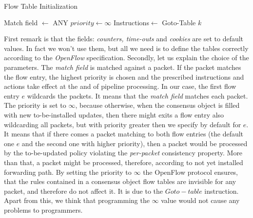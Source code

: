 \documentclass{article}
\theoremstyle{remark}
\begin{document}
\begin{algorithm}
  \caption{Flow Table Initialization}\label{FTInit}
  \begin{algorithmic}[1]
        \State Match field $\gets$ ANY
        \State $priority\gets\infty$
        \State Instructions$\gets$ Goto-Table $k$
      \EndFor
  \end{algorithmic}
\end{algorithm}
First remark is that the fields: \emph{counters, time-outs} and \emph{cookies} are set to default values. In fact we won't use them, but all we need is to define the tables correctly according to the \emph{OpenFlow} specification. Secondly, let us explain the choice of the parameters. The \emph{match field} is matched against a packet. If the packet matches the flow entry, the highest priority is chosen and the prescribed instructions and actions take effect at the and of pipeline processing. In our case, the first flow entry $e$ wildcards the packets. It means that the \emph{match field} matches each packet. The priority is set to $\infty$, because otherwise, when the consensus object is filled with new to-be-installed updates, then there might exits a flow entry also wildcarding all packets, but with priority greater then we specify by default for $e$. It means that if there comes a packet matching to both flow entries (the default one $e$ and the second one with higher priority), then a packet would be processed by the to-be-updated policy violating the \emph{per-packet} consistency property. More than that, a packet might be processed, therefore, according to not yet installed forwarding path.
By setting the priority to $\infty$ the OpenFlow protocol ensures, that the rules contained in a consensus object flow tables are invisible for any packet, and therefore do not affect it. It is due to the $Goto-table$ instruction.
Apart from this, we think that programming the $\infty$ value would not cause any problems to programmers. 
\end{document}
